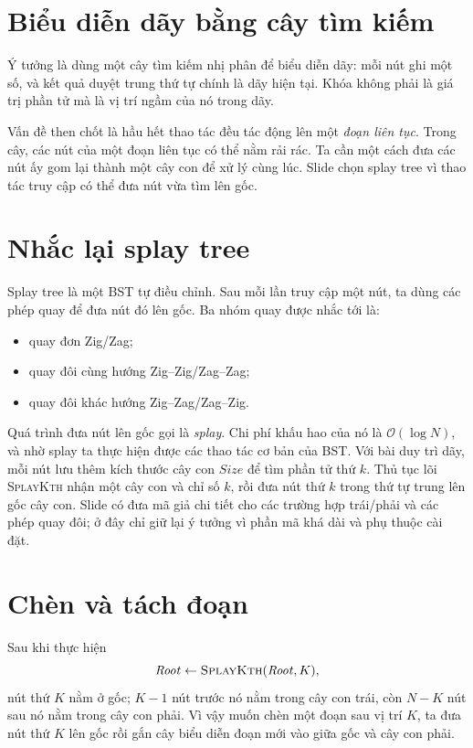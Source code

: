 \documentclass[11pt]{article}
\newcommand{\Oh}{\mathcal{O}}
\begin{document}
\section{Biểu diễn dãy bằng cây tìm kiếm}

Ý tưởng là dùng một cây tìm kiếm nhị phân để biểu diễn dãy: mỗi nút ghi một
số, và kết quả duyệt trung thứ tự chính là dãy hiện tại. Khóa không phải là
giá trị phần tử mà là vị trí ngầm của nó trong dãy.

Vấn đề then chốt là hầu hết thao tác đều tác động lên một \emph{đoạn liên
tục}. Trong cây, các nút của một đoạn liên tục có thể nằm rải rác. Ta cần một
cách đưa các nút ấy gom lại thành một cây con để xử lý cùng lúc. Slide chọn
splay tree vì thao tác truy cập có thể đưa nút vừa tìm lên gốc.

\section{Nhắc lại splay tree}

Splay tree là một BST tự điều chỉnh. Sau mỗi lần truy cập một nút, ta dùng các
phép quay để đưa nút đó lên gốc. Ba nhóm quay được nhắc tới là:
\begin{itemize}
  \item quay đơn Zig/Zag;
  \item quay đôi cùng hướng Zig--Zig/Zag--Zag;
  \item quay đôi khác hướng Zig--Zag/Zag--Zig.
\end{itemize}

Quá trình đưa nút lên gốc gọi là \emph{splay}. Chi phí khấu hao của nó là
\(\Oh(\log N)\), và nhờ splay ta thực hiện được các thao tác cơ bản của BST.
Với bài duy trì dãy, mỗi nút lưu thêm kích thước cây con \(\mathit{Size}\) để
tìm phần tử thứ \(k\). Thủ tục lõi \textsc{SplayKth} nhận một cây con và chỉ
số \(k\), rồi đưa nút thứ \(k\) trong thứ tự trung lên gốc cây con. Slide có
đưa mã giả chi tiết cho các trường hợp trái/phải và các phép quay đôi; ở đây
chỉ giữ lại ý tưởng vì phần mã khá dài và phụ thuộc cài đặt.

\section{Chèn và tách đoạn}

Sau khi thực hiện
\[
  \mathit{Root}\leftarrow \textsc{SplayKth}(\mathit{Root},K),
\]
nút thứ \(K\) nằm ở gốc; \(K-1\) nút trước nó nằm trong cây con trái, còn
\(N-K\) nút sau nó nằm trong cây con phải. Vì vậy muốn chèn một đoạn sau vị
trí \(K\), ta đưa nút thứ \(K\) lên gốc rồi gắn cây biểu diễn đoạn mới vào
giữa gốc và cây con phải.
\end{document}
